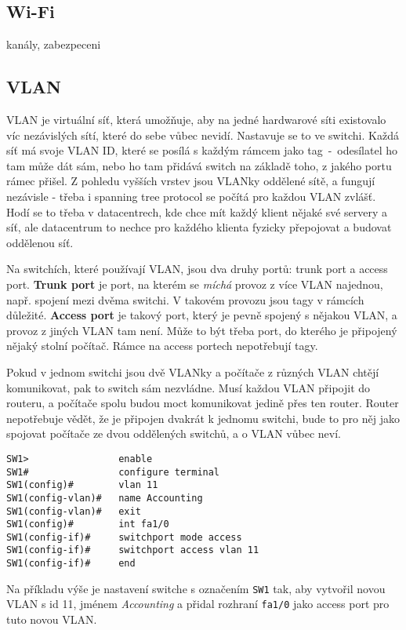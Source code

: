 \subsection{Wi-Fi}
kanály, zabezpeceni

\subsection{VLAN}
VLAN je virtuální síť, která umožňuje, aby na jedné hardwarové síti existovalo víc nezávislých sítí, které do sebe vůbec nevidí. Nastavuje se to ve switchi. Každá síť má svoje VLAN ID, které se posílá s každým rámcem jako tag~-~odesílatel ho tam může dát sám, nebo ho tam přidává switch na základě toho, z jakého portu rámec přišel. Z pohledu vyšších vrstev jsou VLANky oddělené sítě, a fungují nezávisle - třeba i spanning tree protocol se počítá pro každou VLAN zvlášť. Hodí se to třeba v datacentrech, kde chce mít každý klient nějaké své servery a síť, ale datacentrum to nechce pro každého klienta fyzicky přepojovat a budovat oddělenou síť.

Na switchích, které používají VLAN, jsou dva druhy portů: trunk port a access port. \textbf{Trunk port} je port, na kterém se \textit{míchá} provoz z více VLAN najednou, např. spojení mezi dvěma switchi. V takovém provozu jsou tagy v rámcích důležité. \textbf{Access port} je takový port, který je pevně spojený s nějakou VLAN, a provoz z jiných VLAN tam není. Může to být třeba port, do kterého je připojený nějaký stolní počítač. Rámce na access portech nepotřebují tagy.

Pokud v jednom switchi jsou dvě VLANky a počítače z různých VLAN chtějí komunikovat, pak to switch sám nezvládne. Musí každou VLAN připojit do routeru, a počítače spolu budou moct komunikovat jedině přes ten router. Router nepotřebuje vědět, že je připojen dvakrát k jednomu switchi, bude to pro něj jako spojovat počítače ze dvou oddělených switchů, a o VLAN vůbec neví.

\begin{lstlisting}
SW1>                enable
SW1#                configure terminal
SW1(config)#        vlan 11
SW1(config-vlan)#   name Accounting
SW1(config-vlan)#   exit
SW1(config)#        int fa1/0
SW1(config-if)#     switchport mode access
SW1(config-if)#     switchport access vlan 11
SW1(config-if)#     end
\end{lstlisting}

Na příkladu výše je nastavení switche s označením \texttt{SW1} tak, aby vytvořil novou VLAN s id 11, jménem \textit{Accounting} a přidal rozhraní \texttt{fa1/0} jako access port pro tuto novou VLAN.

